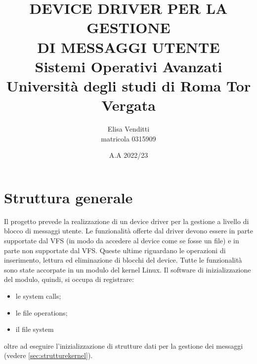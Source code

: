 \documentclass[a4paper,12pt,oneside]{book}
\title{DEVICE DRIVER PER LA GESTIONE \\ DI MESSAGGI UTENTE\\ \bigskip \small{Sistemi Operativi Avanzati} \\Università degli studi di Roma Tor Vergata\\ \bigskip}
\author{Elisa Venditti\\ matricola 0315909 \bigskip}
\date{A.A 2022/23}
\begin{document}
		\maketitle

	\frontmatter
	\tableofcontents
	\mainmatter

	\chapter{Struttura generale}
	Il progetto prevede la realizzazione di un device driver per la gestione a livello di blocco di messaggi utente.  Le funzionalità offerte dal driver devono essere in parte supportate dal VFS (in modo da accedere al device come se fosse un file) e in parte non supportate dal VFS. Queste ultime riguardano le operazioni di inserimento, lettura ed eliminazione di blocchi del device. Tutte le funzionalità sono state accorpate in un modulo del kernel Linux. Il software di inizializzazione del modulo, quindi, si occupa di registrare:
\begin{itemize}
		\item le system calls;
		\item le file operations;
		\item il file system
\end{itemize}
oltre ad eseguire l'inizializzazione di strutture dati per la gestione dei messaggi (vedere \ref{sec:strutturekernel}).
\end{document}

